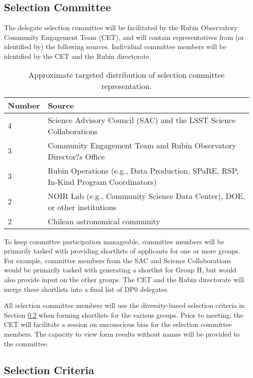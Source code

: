 \documentclass[DM,authoryear,toc]{lsstdoc}
\begin{document}
\subsection{Selection Committee}\label{ssec:sel_comm}

The delegate selection committee will be facilitated by the Rubin Observatory Community Engagement Team (CET), and will contain representatives from (or identified by) the following sources.
Individual committee members will be identified by the CET and the Rubin directorate.

\begin{table}
\centering
\caption{Approximate targeted distribution of selection committee representation.}\label{tab:selection_committee}
\begin{tabular}{ll}
\hline
Number & Source \\
\hline \hline
4 & Science Advisory Council (SAC) and the LSST Science Collaborations \\
3 & Community Engagement Team and Rubin Observatory Director?s Office \\
3 & Rubin Operations (e.g., Data Production, SPaRE, RSP, In-Kind Program Coordinators) \\
2 & NOIR Lab (e.g., Community Science Data Center), DOE, or other institutions \\
2 & Chilean astronomical community \\
\hline
\end{tabular}
\end{table}

To keep committee participation manageable, committee members will be primarily tasked with providing shortlists of applicants for one or more groups.
For example, committee members from the SAC and Science Collaborations would be primarily tasked with generating a shortlist for Group H, but would also provide input on the other groups.
The CET and the Rubin directorate will merge these shortlists into a final list of DP0 delegates.

All selection committee members will use the diversity-based selection criteria in Section \ref{ssec:sel_crit} when forming shortlists for the various groups.
Prior to meeting, the CET will facilitate a session on unconscious bias for the selection committee members.
The capacity to view form results without names will be provided to the committee.

\subsection{Selection Criteria}\label{ssec:sel_crit}
\end{document}
